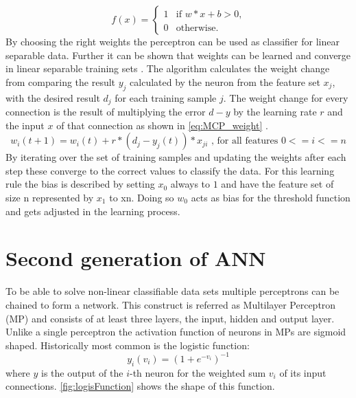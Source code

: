\begin{equation}\label{eq:MCP}
  f(x) =
    \begin{cases}
      1 & \text{if $w*x+b > 0$,} \\
      0 & \text{otherwise.}
    \end{cases}  
\end{equation}
By choosing the right weights the perceptron can be used as classifier for linear separable data. Further it can be shown that weights can be learned and converge in linear separable training sets \cite{Bishop:998831}. The algorithm calculates the weight change from comparing the result $y_j$ calculated by the neuron from the feature set $x_j$, with the desired result $d_j$ for each training sample $j$. The weight change for every connection is the result of multiplying the error $d-y$ by the learning rate $r$ and the input $x$ of that connection as shown in \autoref{eq:MCP_weight} .
\newline
\begin{equation}\label{eq:MCP_weight}
  w_i(t+1) = w_i(t) +r * (d_j - y_j(t))*x_{ji} \text{ , for all features $0<=i<=n$}
\end{equation}
By iterating over the set of training samples and updating the weights after each step these converge to the correct values to classify the data.
\newline
For this learning rule the bias is described by setting $x_0$ always to $1$ and have the feature set of size n represented by $x_1$ to xn. Doing so $w_0$ acts as bias for the threshold function and gets adjusted in the learning process.

\section{Second generation of ANN}\label{sec:backprop}
To be able to solve non-linear classifiable data sets multiple perceptrons can be chained to form a network. This construct is referred as Multilayer Perceptron (MP) and consists of at least three layers, the input, hidden and output layer. Unlike a single perceptron the activation function of neurons in MPs are sigmoid shaped. Historically most common is the logistic function:
\begin{equation}\label{eq:logisFunc}
  y_i(v_i) = (1 + e^{-v_i})^{-1}
\end{equation}
where $y$ is the output of the $i$-th neuron for the weighted sum $v_i$ of its input connections.
\autoref{fig:logisFunction} shows the shape of this function.

